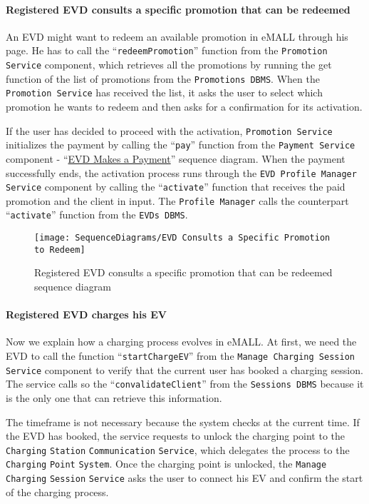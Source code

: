 \paragraph{Registered EVD consults a specific promotion that can be redeemed}
An EVD might want to redeem an available promotion in eMALL through his page.
He has to call the ``\verb|redeemPromotion|'' function from the \verb|Promotion Service| component, which retrieves all the promotions by running the get function of the list of promotions from the \verb|Promotions DBMS|\@.
When the \verb|Promotion Service| has received the list, it asks the user to select which promotion he wants to redeem and then asks for a confirmation for its activation.

If the user has decided to proceed with the activation, \verb|Promotion Service| initializes the payment by calling the ``\verb|pay|'' function from the \verb|Payment Service| component - ``\hyperlink{evdmakespayment}{EVD Makes a Payment}'' sequence diagram.
When the payment successfully ends, the activation process runs through the \verb|EVD Profile Manager Service| component by calling the ``\verb|activate|'' function that receives the paid promotion and the client in input.
The \verb|Profile Manager| calls the counterpart ``\verb|activate|'' function from the \verb|EVDs DBMS|\@.
\begin{figure}[H]
    \begin{center}
        \texttt{[image: SequenceDiagrams/EVD Consults a Specific Promotion to Redeem]}
        \caption{Registered EVD consults a specific promotion that can be redeemed sequence diagram}
        \label{fig:evd_consults_specific_promotion_to_redeem}
    \end{center}
\end{figure}

\paragraph{Registered EVD charges his EV}
Now we explain how a charging process evolves in eMALL\@.
At first, we need the EVD to call the function ``\verb|startChargeEV|'' from the \verb|Manage Charging Session Service| component to verify that the current user has booked a charging session.
The service calls so the ``\verb|convalidateClient|'' from the \verb|Sessions DBMS| because it is the only one that can retrieve this information.

The timeframe is not necessary because the system checks at the current time.
If the EVD has booked, the service requests to unlock the charging point to the \verb|Charging| \verb|Station| \verb|Communication| \verb|Service|, which delegates the process to the \verb|Charging| \verb|Point| \verb|System|.
Once the charging point is unlocked, the \verb|Manage| \verb|Charging| \verb|Session| \verb|Service| asks the user to connect his EV and confirm the start of the charging process.

